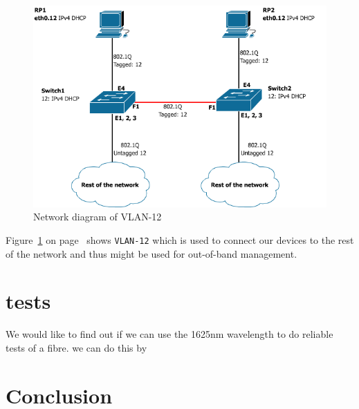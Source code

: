 \documentclass{article}
\begin{document}
\begin{figure}[h]
\centerline{\includegraphics[scale=0.4, trim = 0mm 0mm 0mm 0mm]{images/PoC_12.png}}
\caption{Network diagram of VLAN-12}
\label{fig:poc_12}
\end{figure}
Figure~\ref{fig:poc_12} on page~\pageref{fig:poc_12} shows \texttt{VLAN-12} which is used to connect our devices to the rest of the network and thus might be used for out-of-band management.

\newpage
\section{tests}
We would like to find out if we can use the 1625nm wavelength to do reliable tests of a fibre. we can do this by 





\newpage
\section{Conclusion}


\end{document}
